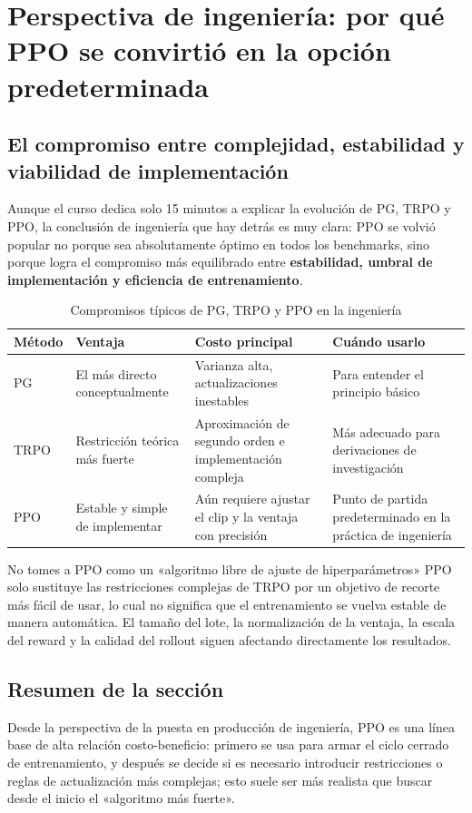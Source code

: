 \documentclass[a4paper]{article}
\begin{document}
\section{Perspectiva de ingeniería: por qué PPO se convirtió en la opción predeterminada}
\subsection{El compromiso entre complejidad, estabilidad y viabilidad de implementación}
Aunque el curso dedica solo 15 minutos a explicar la evolución de PG, TRPO y PPO, la conclusión de ingeniería que hay detrás es muy clara: PPO se volvió popular no porque sea absolutamente óptimo en todos los benchmarks, sino porque logra el compromiso más equilibrado entre \textbf{estabilidad, umbral de implementación y eficiencia de entrenamiento}.

\begin{table}[H]
\centering
\begin{tabular}{p{2.6cm}p{3.5cm}p{3.7cm}p{3.2cm}}
\toprule
Método & Ventaja & Costo principal & Cuándo usarlo \\
\midrule
PG & El más directo conceptualmente & Varianza alta, actualizaciones inestables & Para entender el principio básico \\
TRPO & Restricción teórica más fuerte & Aproximación de segundo orden e implementación compleja & Más adecuado para derivaciones de investigación \\
PPO & Estable y simple de implementar & Aún requiere ajustar el clip y la ventaja con precisión & Punto de partida predeterminado en la práctica de ingeniería \\
\bottomrule
\end{tabular}
\caption{Compromisos típicos de PG, TRPO y PPO en la ingeniería}
\end{table}

\begin{warningbox}{No tomes a PPO como un «algoritmo libre de ajuste de hiperparámetros»}
PPO solo sustituye las restricciones complejas de TRPO por un objetivo de recorte más fácil de usar, lo cual no significa que el entrenamiento se vuelva estable de manera automática. El tamaño del lote, la normalización de la ventaja, la escala del reward y la calidad del rollout siguen afectando directamente los resultados.
\end{warningbox}

\subsection{Resumen de la sección}
Desde la perspectiva de la puesta en producción de ingeniería, PPO es una línea base de alta relación costo-beneficio: primero se usa para armar el ciclo cerrado de entrenamiento, y después se decide si es necesario introducir restricciones o reglas de actualización más complejas; esto suele ser más realista que buscar desde el inicio el «algoritmo más fuerte».
\end{document}
